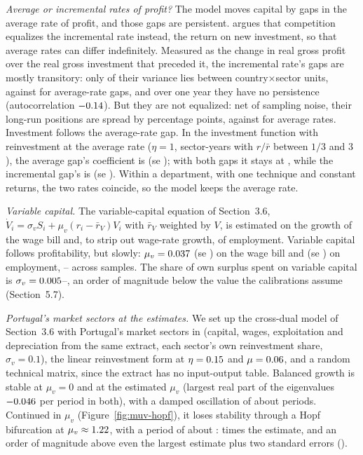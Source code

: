 \documentclass[11pt]{article}
\begin{document}
\emph{Average or incremental rates of profit?} The model moves capital
by gaps in the average rate of profit, and those gaps are persistent.
\citet[ch.~7]{shaikh2016capitalism} argues that competition equalizes
the incremental rate instead, the return on new investment, so that
average rates can differ indefinitely. Measured as the change in real
gross profit over the real gross investment that preceded it, the
incremental rate's gaps are mostly transitory: only
\IncBetweenInc{} of their variance lies between country$\times$sector
units, against \IncBetweenAvg{} for average-rate gaps, and over one year
they have no persistence (autocorrelation $-0.14$). But they
are not equalized: net of sampling noise, their long-run positions are
spread by \IncPermInc{} percentage points, against \IncPermAvg{} for
average rates. Investment follows the average-rate gap. In the
investment function with reinvestment at the average rate ($\eta=1$,
\IncRows{} sector-years with $r/\bar r$ between $1/3$ and $3$), the
average gap's coefficient is \IncMuAvg{} (se \IncMuAvgSe); with both
gaps it stays at \IncBothAvg, while the incremental gap's is \IncBothInc{}
(se \IncBothIncSe). Within a department, with one technique and constant
returns, the two rates coincide, so the model keeps the average rate.

\emph{Variable capital.} The variable-capital equation of
Section~3.6, $\dot V_i=\sigma_vS_i+\mu_v(r_i-\bar r_V)V_i$ with
$\bar r_V$ weighted by $V$, is estimated on the growth of the wage bill
and, to strip out wage-rate growth, of employment. Variable capital
follows profitability, but slowly: $\mu_v=0.037$ (se \EstMuVSe) on the
wage bill and \EstMuVEmp{} (se \EstMuVEmpSe) on employment,
\EstMuVMin--\EstMuVMax{} across samples. The share of own surplus spent
on variable capital is $\sigma_v=0.005$--\EstSigmaVMax, an order
of magnitude below the value the calibrations assume (Section~5.7).

\emph{Portugal's market sectors at the estimates.} We set up the
cross-dual model of Section~3.6 with Portugal's \EstSectors{} market
sectors in \EstPTYear{} (capital, wages, exploitation and depreciation
from the same extract, each sector's own reinvestment share,
$\sigma_v=0.1$), the linear reinvestment form at $\eta=0.15$ and
$\mu=0.06$, and a random technical matrix, since the extract has no
input-output table. Balanced growth is stable at $\mu_v=0$ and at the
estimated $\mu_v$ (largest real part of the eigenvalues $-0.046$
per period in both), with a damped oscillation of about
\EstStablePeriod{} periods. Continued in $\mu_v$
(Figure~\ref{fig:muv-hopf}), it loses stability through a Hopf
bifurcation at $\mu_v\approx1.22$, with a period of about
\EstHopfPeriod{}: \EstHopfRatio{} times the estimate, and an order of
magnitude above even the largest estimate plus two standard errors
(\EstMuVUpper).
\end{document}
